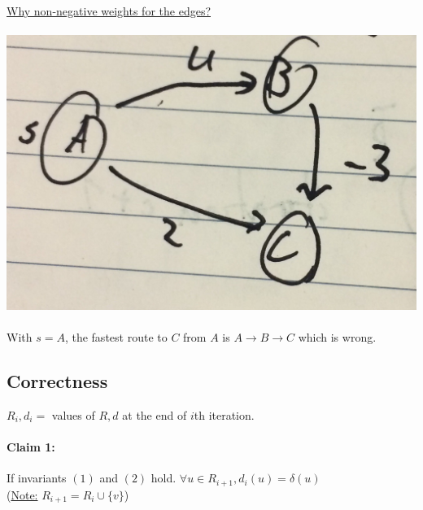 \documentclass[12pt]{article}
\begin{document}
\underline{Why non-negative weights for the edges?}\\
\\
\includegraphics[scale=0.25]{lec3-1}
\\
\\
With $s = A$, the fastest route to $C$ from $A$ is $A \rightarrow B \rightarrow C$ which is wrong.

\subsection{Correctness}

$R_i, d_i = $ values of $R,d$ at the end of $i$th iteration.

\paragraph{Claim 1:} If invariants $(1)$ and $(2)$ hold. $\forall u \in R_{i+1}, d_i (u) = \delta (u)$\\
(\underline{Note:} $R_{i+1} = R_i \cup \{ v \}$)
\end{document}
